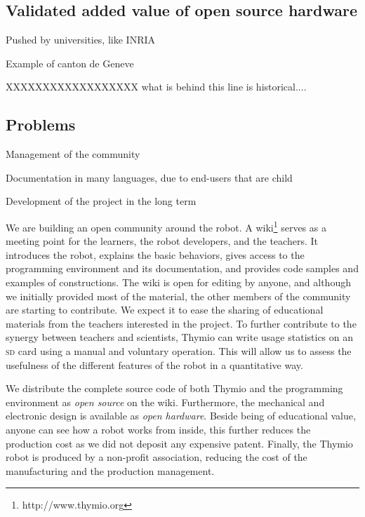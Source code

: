 \documentclass[letterpaper, 10 pt, conference]{ieeeconf}  %
\begin{document}
\subsection{Validated added value of open source hardware}



Pushed by universities, like INRIA

Example of canton de Geneve

XXXXXXXXXXXXXXXXXX what is behind this line is historical....

\subsection{Problems}

Management of the community

Documentation in many languages, due to end-users that are child

Development of the project in the long term

We are building an open community around the robot.
A wiki\footnote{http://www.thymio.org} serves as a meeting point for the learners, the robot developers, and the teachers.
It introduces the robot, explains the basic behaviors, gives access to the programming environment and its documentation, and provides code samples and examples of constructions.
The wiki is open for editing by anyone, and although we initially provided most of the material, the other members of the community are starting to contribute.
We expect it to ease the sharing of educational materials from the teachers interested in the project.
To further contribute to the synergy between teachers and scientists, Thymio can write usage statistics on an \textsc{sd} card using a manual and voluntary operation.
This will allow us to assess the usefulness of the different features of the robot in a quantitative way.

We distribute the complete source code of both Thymio and the programming environment as \emph{open source} on the wiki.
Furthermore, the mechanical and electronic design is available as \emph{open hardware}.
Beside being of educational value, anyone can see how a robot works from inside, this further reduces the production cost as we did not deposit any expensive patent.
Finally, the Thymio robot is produced by a non-profit association, reducing the cost of the manufacturing and the production management.
\end{document}
